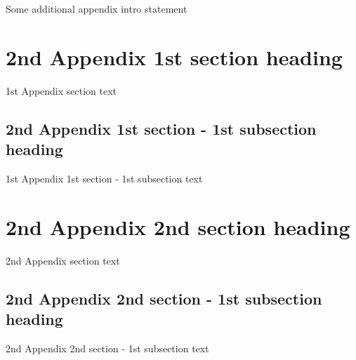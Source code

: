 Some additional appendix intro statement

\section[2nd Appendix 1st section ToC title]{2nd Appendix 1st section heading}

1st Appendix section text

\subsection[2nd Appendix 1st section - 1st subsection ToC title]{2nd Appendix 1st section - 1st subsection heading}

1st Appendix 1st section - 1st subsection text

\section[2nd Appendix 2nd section ToC title]{2nd Appendix 2nd section heading}

2nd Appendix section text

\subsection[2nd Appendix 2nd section - 1st subsection ToC title]{2nd Appendix 2nd section - 1st subsection heading}

2nd Appendix 2nd section - 1st subsection text

\endinput
